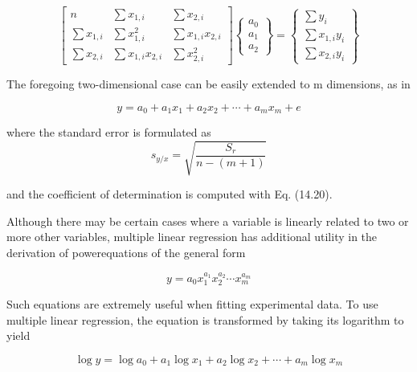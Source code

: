 \documentclass[../main.tex]{subfiles}
\begin{document}
\begin{equation} %
	\tag{15.5}
	\begin{bmatrix}
		n & \sum x_{1,i} & \sum x_{2,i} \\
		\sum x_{1,i} & \sum x_{1,i}^2 & \sum x_{1,i} x_{2,i} \\
		\sum x_{2,i} & \sum x_{1,i} x_{2,i} & \sum x_{2,i}^2
	\end{bmatrix}
	\begin{Bmatrix}
		a_0 \\ a_1 \\ a_2
	\end{Bmatrix} =
	\begin{Bmatrix}
		\sum y_i \\ \sum x_{1,i} y_i \\ \sum x_{2,i} y_i
	\end{Bmatrix}
\end{equation}


The foregoing two-dimensional case can be easily extended to m dimensions, as in

\begin{equation}
	y = a_0 + a_1 x_1 + a_2 x_2 + \cdots + a_m x_m + e
\end{equation}


\noindent where the standard error is formulated as
\begin{equation}
	s_{y/x} = \sqrt{\frac{S_r}{n - (m + 1)}}
\end{equation}

\noindent and the coefficient of determination is computed with Eq. (14.20).

Although there may be certain cases where a variable is linearly related to two or more other variables, multiple linear regression has additional utility in the derivation of powerequations of the general form 

\begin{equation}
	y = a_0 x_1 ^ {a_1} x_2 ^ {a_2} \cdots x_m ^ {a_m}
\end{equation}

\noindent Such equations are extremely useful when fitting experimental data. To use multiple linear regression, the equation is transformed by taking its logarithm to yield

\begin{equation}
	\log y = \log a_0 + a_1 \log x_1 + a_2 \log x_2 + \cdots + a_m \log x_m
\end{equation}
\end{document}
